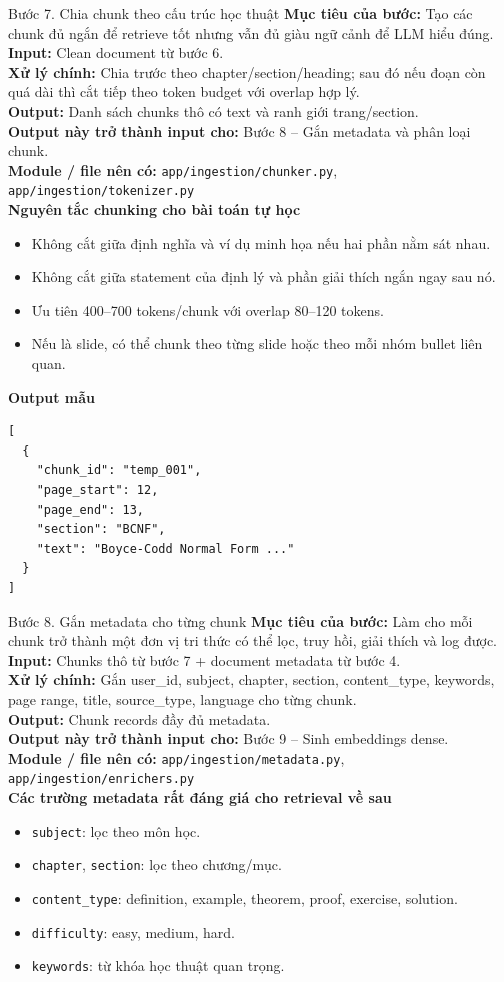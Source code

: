 \documentclass[12pt,a4paper]{article}
\newcommand{\stepgoal}[1]{\textbf{Mục tiêu của bước:} #1\\}
\newcommand{\stepinput}[1]{\textbf{Input:} #1\\}
\newcommand{\stepprocess}[1]{\textbf{Xử lý chính:} #1\\}
\newcommand{\stepoutput}[1]{\textbf{Output:} #1\\}
\newcommand{\stepnext}[1]{\textbf{Output này trở thành input cho:} #1\\}
\newcommand{\stepmodules}[1]{\textbf{Module / file nên có:} #1\\}
\begin{document}
\begin{stepbox}{Bước 7. Chia chunk theo cấu trúc học thuật}
\stepgoal{Tạo các chunk đủ ngắn để retrieve tốt nhưng vẫn đủ giàu ngữ cảnh để LLM hiểu đúng.}
\stepinput{Clean document từ bước 6.}
\stepprocess{Chia trước theo chapter/section/heading; sau đó nếu đoạn còn quá dài thì cắt tiếp theo token budget với overlap hợp lý.}
\stepoutput{Danh sách chunks thô có text và ranh giới trang/section.}
\stepnext{Bước 8 -- Gắn metadata và phân loại chunk.}
\stepmodules{\texttt{app/ingestion/chunker.py}, \texttt{app/ingestion/tokenizer.py}}

\textbf{Nguyên tắc chunking cho bài toán tự học}
\begin{itemize}
    \item Không cắt giữa định nghĩa và ví dụ minh họa nếu hai phần nằm sát nhau.
    \item Không cắt giữa statement của định lý và phần giải thích ngắn ngay sau nó.
    \item Ưu tiên 400--700 tokens/chunk với overlap 80--120 tokens.
    \item Nếu là slide, có thể chunk theo từng slide hoặc theo mỗi nhóm bullet liên quan.
\end{itemize}

\textbf{Output mẫu}
\begin{lstlisting}
[
  {
    "chunk_id": "temp_001",
    "page_start": 12,
    "page_end": 13,
    "section": "BCNF",
    "text": "Boyce-Codd Normal Form ..."
  }
]
\end{lstlisting}
\end{stepbox}

\begin{stepbox}{Bước 8. Gắn metadata cho từng chunk}
\stepgoal{Làm cho mỗi chunk trở thành một đơn vị tri thức có thể lọc, truy hồi, giải thích và log được.}
\stepinput{Chunks thô từ bước 7 + document metadata từ bước 4.}
\stepprocess{Gắn user\_id, subject, chapter, section, content\_type, keywords, page range, title, source\_type, language cho từng chunk.}
\stepoutput{Chunk records đầy đủ metadata.}
\stepnext{Bước 9 -- Sinh embeddings dense.}
\stepmodules{\texttt{app/ingestion/metadata.py}, \texttt{app/ingestion/enrichers.py}}

\textbf{Các trường metadata rất đáng giá cho retrieval về sau}
\begin{itemize}
    \item \texttt{subject}: lọc theo môn học.
    \item \texttt{chapter}, \texttt{section}: lọc theo chương/mục.
    \item \texttt{content\_type}: definition, example, theorem, proof, exercise, solution.
    \item \texttt{difficulty}: easy, medium, hard.
    \item \texttt{keywords}: từ khóa học thuật quan trọng.
\end{itemize}
\end{stepbox}
\end{document}
